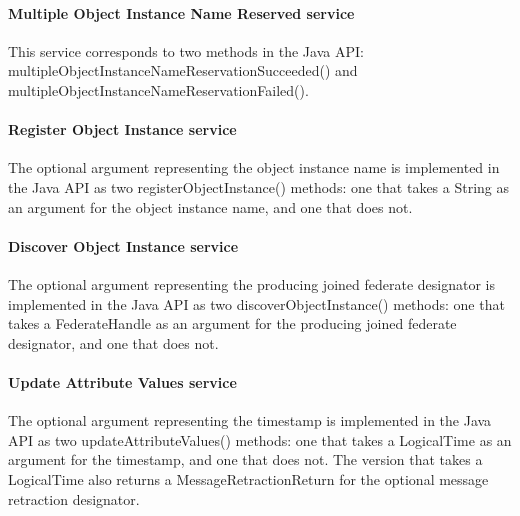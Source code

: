 \begin{compactstdpage}
    \paragraph{Multiple Object Instance Name Reserved \rtiinitiated{} service}

    This service corresponds to two methods in the Java API: multipleObjectInstanceNameReservationSucceeded() and multipleObjectInstanceNameReservationFailed().

    \paragraph{Register Object Instance service}

    The optional argument representing the object instance name is implemented in the Java API as two registerObjectInstance() methods: one that takes a String as an argument for the object instance name, and one that does not.

    \paragraph{Discover Object Instance service}

    The optional argument representing the producing joined federate designator is implemented in the Java API as two discoverObjectInstance() methods: one that takes a FederateHandle as an argument for the producing joined federate designator, and one that does not.

    \paragraph{Update Attribute Values service}

    The optional argument representing the timestamp is implemented in the Java API as two updateAttributeValues() methods: one that takes a LogicalTime as an argument for the timestamp, and one that does not. The version that takes a LogicalTime also returns a MessageRetractionReturn for the optional message retraction designator.

\end{compactstdpage}

\clearpage

